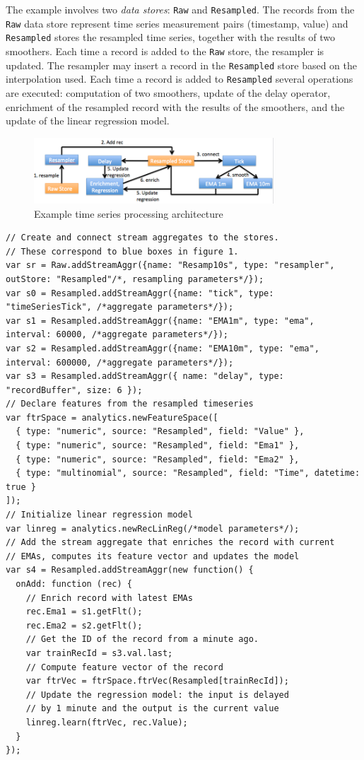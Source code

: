 \documentclass{article} %
\begin{document}
The example involves two \emph{data stores}: \texttt{Raw} and \texttt{Resampled}. The records from the \texttt{Raw} data store represent time series measurement pairs (timestamp, value) and \texttt{Resampled} stores the resampled time series, together with the results of two smoothers. Each time a record is added to the \texttt{Raw} store, the resampler is updated. The resampler may insert a record in the \texttt{Resampled} store based on the interpolation used. Each time a record is added to \texttt{Resampled} several operations are executed: computation of two smoothers, update of the delay operator, enrichment of the resampled record with the results of the smoothers, and the update of the linear regression model.

\begin{figure}[h]
\begin{center}
\includegraphics[width=0.8\textwidth]{timeSeries3.PNG}
\end{center}
\caption{Example time series processing architecture}\label{fig:timeSeries}
\end{figure}

\begin{lstlisting}[caption=Example time series processing] 	
// Create and connect stream aggregates to the stores. 
// These correspond to blue boxes in figure 1.
var sr = Raw.addStreamAggr({name: "Resamp10s", type: "resampler", outStore: "Resampled"/*, resampling parameters*/});
var s0 = Resampled.addStreamAggr({name: "tick", type: "timeSeriesTick", /*aggregate parameters*/});
var s1 = Resampled.addStreamAggr({name: "EMA1m", type: "ema", interval: 60000, /*aggregate parameters*/});
var s2 = Resampled.addStreamAggr({name: "EMA10m", type: "ema", interval: 600000, /*aggregate parameters*/});
var s3 = Resampled.addStreamAggr({ name: "delay", type: "recordBuffer", size: 6 });
// Declare features from the resampled timeseries
var ftrSpace = analytics.newFeatureSpace([
  { type: "numeric", source: "Resampled", field: "Value" },
  { type: "numeric", source: "Resampled", field: "Ema1" },
  { type: "numeric", source: "Resampled", field: "Ema2" },
  { type: "multinomial", source: "Resampled", field: "Time", datetime: true }
]);
// Initialize linear regression model
var linreg = analytics.newRecLinReg(/*model parameters*/);
// Add the stream aggregate that enriches the record with current
// EMAs, computes its feature vector and updates the model
var s4 = Resampled.addStreamAggr(new function() {
  onAdd: function (rec) {
    // Enrich record with latest EMAs
    rec.Ema1 = s1.getFlt();
    rec.Ema2 = s2.getFlt();
    // Get the ID of the record from a minute ago.
    var trainRecId = s3.val.last;
    // Compute feature vector of the record
    var ftrVec = ftrSpace.ftrVec(Resampled[trainRecId]);
    // Update the regression model: the input is delayed 
    // by 1 minute and the output is the current value
    linreg.learn(ftrVec, rec.Value);
  }
});
\end{lstlisting}
\end{document}
